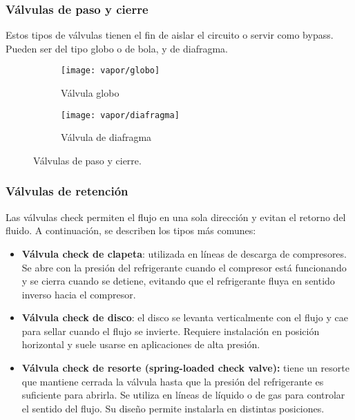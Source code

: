 \subsubsection{Válvulas de paso y cierre}

Estos tipos de válvulas tienen el fin de aislar el circuito o servir como bypass.
Pueden ser del tipo globo o de bola, y de diafragma.

\begin{figure}[h]
  \centering
  \begin{subfigure}{.35\linewidth}
      \texttt{[image: vapor/globo]}
      \caption{Válvula globo}
  \end{subfigure}
  \begin{subfigure}{.25\linewidth}
      \texttt{[image: vapor/diafragma]}
      \caption{Válvula de diafragma}
  \end{subfigure}
  \caption{Válvulas de paso y cierre.}
\end{figure}

\subsubsection{Válvulas de retención}

Las válvulas check permiten el flujo en una sola dirección y evitan el retorno del fluido. A continuación, se describen los tipos más comunes:

\begin{itemize}
    \item \textbf{Válvula check de clapeta}: utilizada en líneas de descarga de compresores. Se abre con la presión del refrigerante cuando el compresor está funcionando y se cierra cuando se detiene, evitando que el refrigerante fluya en sentido inverso hacia el compresor.


    \item \textbf{Válvula check de disco}: el disco se levanta verticalmente con el flujo y cae para sellar cuando el flujo se invierte. Requiere instalación en posición horizontal y suele usarse en aplicaciones de alta presión.


    \item \textbf{Válvula check de resorte (spring-loaded check valve):}  tiene un resorte que mantiene cerrada la válvula hasta que la presión del refrigerante es suficiente para abrirla. Se utiliza en líneas de líquido o de gas para controlar el sentido del flujo. Su diseño permite instalarla en distintas posiciones.

\end{itemize}

